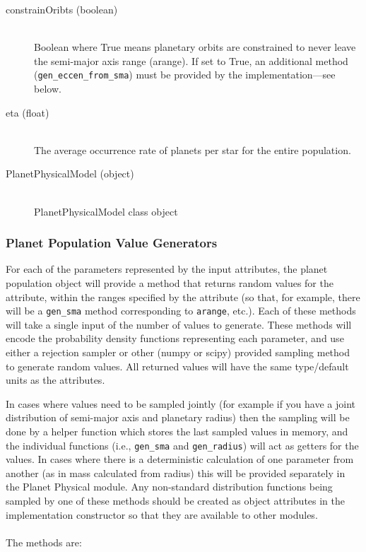 \documentclass[cleanfoot]{asme2ej}
\begin{document}
\begin{itemize}
\begin{description}
        \item[constrainOribts (boolean)] \hfill \\
        Boolean where True means planetary orbits are constrained to never leave the semi-major axis range (arange). If set to True, an additional method (\verb+gen_eccen_from_sma+) must be provided by the implementation---see below.
        \item[eta (float)] \hfill \\
        The average occurrence rate of planets per star for the entire population.
        \item[PlanetPhysicalModel (object)] \hfill \\     
            PlanetPhysicalModel class object
    \end{description}
\end{itemize}

\subsubsection{Planet Population Value Generators} \label{sec:pdfs}
For each of the parameters represented by the input attributes, the planet population object will provide a method that returns random values for the attribute, within the ranges specified by the attribute (so that, for example, there will be a \verb+gen_sma+ method corresponding to \verb+arange+, etc.).  Each of these methods will take a single input of the number of values to generate.  These methods will encode the probability density functions representing each parameter, and use either a rejection sampler or other (numpy or scipy) provided sampling method to generate random values.  All returned values will have the same type/default units as the attributes. 

In cases where values need to be sampled jointly (for example if you have a joint distribution of semi-major axis and planetary radius) then the sampling will be done by a helper function which stores the last sampled values in memory, and the individual functions (i.e., \verb+gen_sma+ and \verb+gen_radius+) will act as getters for the values.  In cases where there is a deterministic calculation of one parameter from another (as in mass calculated from radius) this will be provided separately in the Planet Physical module. Any non-standard distribution functions being sampled by one of these methods should be created as object attributes in the implementation constructor so that they are available to other modules.
\\\\
The methods are:
\end{document}
